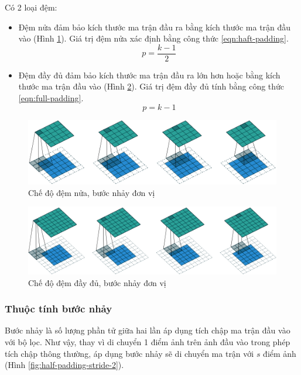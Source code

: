Có 2 loại đệm:
\begin{itemize}
	\item Đệm nửa đảm bảo kích thước ma trận đầu ra bằng kích thước ma trận đầu vào (Hình \ref{fig:half-padding-unit-stride1}). Giá trị đệm nửa xác định bằng công thức \ref{eqn:haft-padding}.
	\begin{equation}\label{eqn:haft-padding}
		p = \frac{k-1}{2}
	\end{equation}
	\item Đệm đầy đủ đảm bảo kích thước ma trận đầu ra lớn hơn hoặc bằng kích thước ma trận đầu vào (Hình \ref{fig:full-padding-unit-stride}). Giá trị đệm đầy đủ tính bằng công thức \ref{eqn:full-padding}.
	\begin{equation}\label{eqn:full-padding}
		p = k-1
	\end{equation}
\end{itemize}
\begin{figure}
	\centering
	\includegraphics[width=0.9\linewidth]{images/half-padding-unit-stride1}
	\caption{Chế độ đệm nửa, bước nhảy đơn vị}
	\label{fig:half-padding-unit-stride1}
\end{figure}

\begin{figure}
	\centering
	\includegraphics[width=0.9\linewidth]{images/full-padding-unit-stride}
	\caption{Chế độ đệm đầy đủ, bước nhảy đơn vị}
	\label{fig:full-padding-unit-stride}
\end{figure}

\subsubsection{Thuộc tính bước nhảy}

Bước nhảy là số lượng phần tử giữa hai lần áp dụng tích chập ma trận đầu vào với bộ lọc. Như vậy, thay vì di chuyển 1 điểm ảnh trên ảnh đầu vào trong phép tích chập thông thường, áp dụng bước nhảy sẽ di chuyển ma trận với $s$ điểm ảnh (Hình \ref{fig:half-padding-stride-2}).

